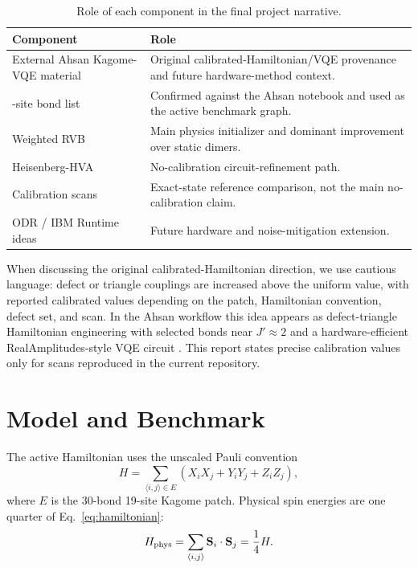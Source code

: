 \documentclass[11pt]{article}
\begin{document}
\begin{table}[H]
\centering
\caption{Role of each component in the final project narrative.}
\label{tab:component_roles}
\begin{tabular}{>{\raggedright\arraybackslash}p{}>{\raggedright\arraybackslash}p{}}
\toprule
Component & Role \\
\midrule
External Ahsan Kagome-VQE material & Original calibrated-Hamiltonian/VQE provenance and future hardware-method context. \\
19-site bond list & Confirmed against the Ahsan notebook and used as the active benchmark graph. \\
Weighted RVB & Main physics initializer and dominant improvement over static dimers. \\
Heisenberg-HVA & No-calibration circuit-refinement path. \\
Calibration scans & Exact-state reference comparison, not the main no-calibration claim. \\
ODR / IBM Runtime ideas & Future hardware and noise-mitigation extension. \\
\bottomrule
\end{tabular}
\end{table}

When discussing the original calibrated-Hamiltonian direction, we use cautious language: defect or triangle couplings are increased above the uniform value, with reported calibrated values depending on the patch, Hamiltonian convention, defect set, and scan.  In the Ahsan workflow this idea appears as defect-triangle Hamiltonian engineering with selected bonds near $J'\approx 2$ and a hardware-efficient RealAmplitudes-style VQE circuit \cite{ahsan2026}.  This report states precise calibration values only for scans reproduced in the current repository.

\section{Model and Benchmark}

The active Hamiltonian uses the unscaled Pauli convention
\begin{equation}
H = \sum_{\langle i,j\rangle \in E}
\left(X_iX_j + Y_iY_j + Z_iZ_j\right),
\label{eq:hamiltonian}
\end{equation}
where $E$ is the 30-bond 19-site Kagome patch.  Physical spin energies are one quarter of Eq.~\eqref{eq:hamiltonian}:
\[
H_{\rm phys} = \sum_{\langle i,j\rangle} \mathbf{S}_i\cdot\mathbf{S}_j
= \frac{1}{4}H.
\]
\end{document}

